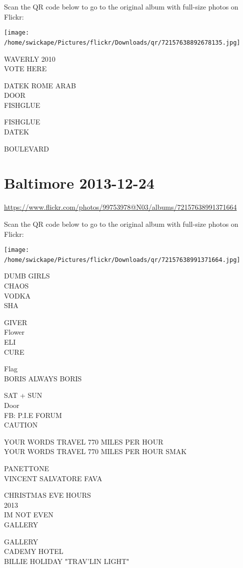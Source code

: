 \documentclass[10pt,letterpaper]{article}
\begin{document}
Scan the QR code below to go to the original album with full-size photos on Flickr:

\texttt{[image: /home/swickape/Pictures/flickr/Downloads/qr/72157638892678135.jpg]}
\

WAVERLY 2010\\
VOTE HERE

DATEK ROME ARAB\\
DOOR\\
FISHGLUE

FISHGLUE\\
DATEK

BOULEVARD
\

\section*{Baltimore 2013-12-24}

\url{https://www.flickr.com/photos/99753978@N03/albums/72157638991371664}

Scan the QR code below to go to the original album with full-size photos on Flickr:

\texttt{[image: /home/swickape/Pictures/flickr/Downloads/qr/72157638991371664.jpg]}
\

DUMB GIRLS\\
CHAOS\\
VODKA\\
SHA

GIVER\\
Flower\\
ELI\\
CURE

Flag\\
BORIS ALWAYS BORIS

SAT + SUN\\
Door\\
FB: P.I.E FORUM\\
CAUTION

YOUR WORDS TRAVEL 770 MILES PER HOUR\\
YOUR WORDS TRAVEL 770 MILES PER HOUR SMAK

PANETTONE\\
VINCENT SALVATORE FAVA

CHRISTMAS EVE HOURS\\
2013\\
IM NOT EVEN\\
GALLERY

GALLERY\\
CADEMY HOTEL\\
BILLIE HOLIDAY "TRAV'LIN LIGHT"
\end{document}
